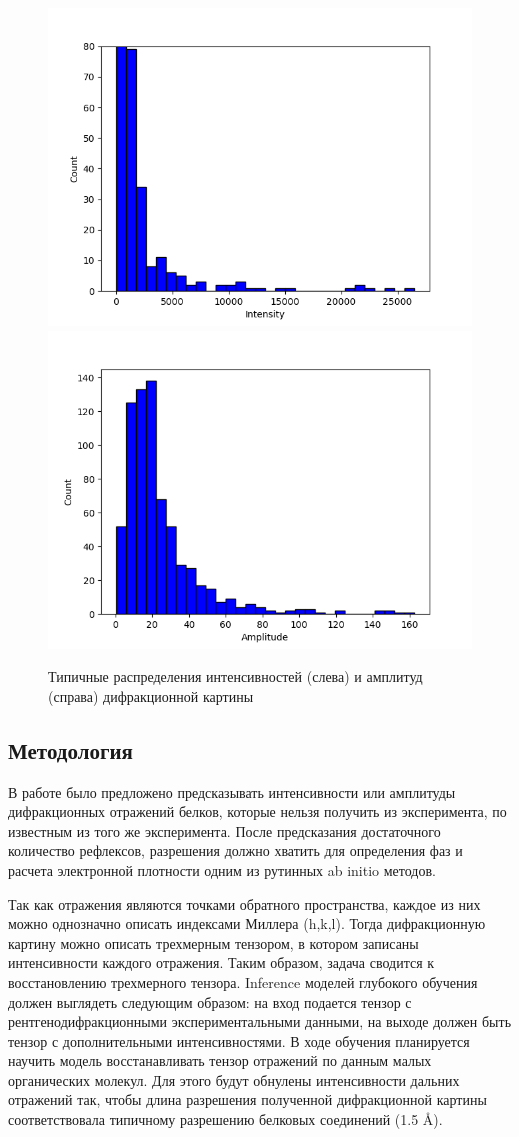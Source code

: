 \documentclass[a4paper,12pt]{article}
\begin{document}
{\begin{figure}[ht!]
            \includegraphics[width=.5\textwidth]{F2_distribution.png}\hfill
            \includegraphics[width=.5\textwidth]{F_distribution.png}
            \caption{Типичные распределения интенсивностей (слева) и амплитуд (справа) дифракционной картины}
            \label{F_dist}
\end{figure}




\subsection*{Методология}

В работе было предложено предсказывать интенсивности или амплитуды дифракционных отражений белков, которые нельзя получить из эксперимента, по известным из того же эксперимента. После предсказания достаточного количество рефлексов, разрешения должно хватить для определения фаз и расчета электронной плотности одним из рутинных ab initio методов.

Так как отражения являются точками обратного пространства, каждое из них можно однозначно описать индексами Миллера (h,k,l). Тогда дифракционную картину можно описать трехмерным тензором, в котором записаны интенсивности каждого отражения. Таким образом, задача сводится к восстановлению трехмерного тензора. Inference моделей глубокого обучения должен выглядеть следующим образом: на вход подается тензор с рентгенодифракционными экспериментальными данными, на выходе должен быть тензор с дополнительными интенсивностями. В ходе обучения планируется научить модель восстанавливать тензор отражений по данным малых органических молекул. Для этого будут обнулены интенсивности дальних отражений так, чтобы длина разрешения полученной дифракционной картины соответствовала типичному разрешению белковых соединений (1.5 Å).

}
\end{document}
